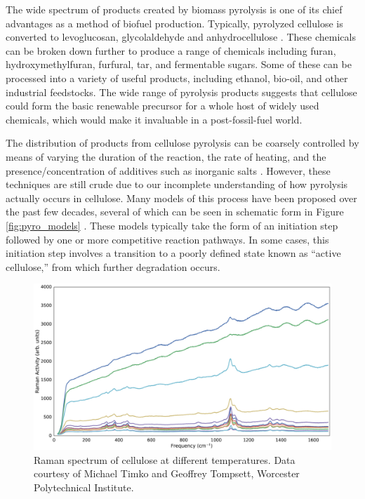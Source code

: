 The wide spectrum of products created by biomass pyrolysis is one of its chief advantages as a method of biofuel production. Typically, pyrolyzed cellulose is converted to levoglucosan, glycolaldehyde and anhydrocellulose \cite{RefWorks:56, RefWorks:57}. These chemicals can be broken down further to produce a range of chemicals including furan, hydroxymethylfuran, furfural, tar, and fermentable sugars. Some of these can be processed into a variety of useful products, including ethanol, bio-oil, and other industrial feedstocks. The wide range of pyrolysis products suggests that cellulose could form the basic renewable precursor for a whole host of widely used chemicals, which would make it invaluable in a post-fossil-fuel world.

The distribution of products from cellulose pyrolysis can be coarsely controlled by means of varying the duration of the reaction, the rate of heating, and the presence/concentration of additives such as inorganic salts \cite{RefWorks:59}. However, these techniques are still crude due to our incomplete understanding of how pyrolysis actually occurs in cellulose. Many models of this process have been proposed over the past few decades, several of which can be seen in schematic form in Figure \ref{fig:pyro_models} \cite{RefWorks:58}. These models typically take the form of an initiation step followed by one or more competitive reaction pathways. In some cases, this initiation step involves a transition to a poorly defined state known as ``active cellulose,'' from which further degradation occurs.

\begin{figure}
	\centering
	\includegraphics[width=\linewidth]{ref_plot}
	\caption{Raman spectrum of cellulose at different temperatures. Data courtesy of Michael Timko and Geoffrey Tompsett, Worcester Polytechnical Institute.}
	\label{fig:ref_plot}
\end{figure}

